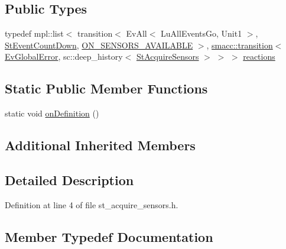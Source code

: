 \subsection*{Public Types}
\begin{DoxyCompactItemize}
\item 
typedef mpl\+::list$<$ transition$<$ Ev\+All$<$ Lu\+All\+Events\+Go, Unit1 $>$, \hyperlink{structsm__dance__bot_1_1StEventCountDown}{St\+Event\+Count\+Down}, \hyperlink{structsm__dance__bot_1_1StAcquireSensors_1_1ON__SENSORS__AVAILABLE}{O\+N\+\_\+\+S\+E\+N\+S\+O\+R\+S\+\_\+\+A\+V\+A\+I\+L\+A\+B\+LE} $>$, \hyperlink{classsmacc_1_1transition}{smacc\+::transition}$<$ \hyperlink{structsm__dance__bot_1_1EvGlobalError}{Ev\+Global\+Error}, sc\+::deep\+\_\+history$<$ \hyperlink{structsm__dance__bot_1_1StAcquireSensors}{St\+Acquire\+Sensors} $>$ $>$ $>$ \hyperlink{structsm__dance__bot_1_1StAcquireSensors_aee65ad66e119102e3ef5e2e959c0e08b}{reactions}
\end{DoxyCompactItemize}
\subsection*{Static Public Member Functions}
\begin{DoxyCompactItemize}
\item 
static void \hyperlink{structsm__dance__bot_1_1StAcquireSensors_ae30f4b633faa922070fc8412b6dd78fc}{on\+Definition} ()
\end{DoxyCompactItemize}
\subsection*{Additional Inherited Members}


\subsection{Detailed Description}


Definition at line 4 of file st\+\_\+acquire\+\_\+sensors.\+h.



\subsection{Member Typedef Documentation}

